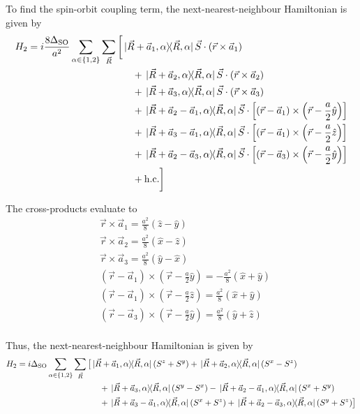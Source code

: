 \documentclass[12pt,a4paper,titlepage]{article}
\newcommand{\trm}[1]{\textrm{#1}} %
\begin{document}
To find the spin-orbit coupling term, the next-nearest-neighbour Hamiltonian is given by
\begin{equation}
\begin{aligned}
H_{2}=i\frac{8\Delta_{\trm{SO}}}{a^{2}}\sum_{\alpha\in\{1,2\}}\sum_{\vec{R}}\bigg[&\ketbra*{\vec{R}+\vec{a}_{1},\alpha}{\vec{R},\alpha}\vec{S}\cdot(\vec{r}\times\vec{a}_{1})\\
&\quad+\ketbra*{\vec{R}+\vec{a}_{2},\alpha}{\vec{R},\alpha}\vec{S}\cdot(\vec{r}\times\vec{a}_{2})\\
&\quad+\ketbra*{\vec{R}+\vec{a}_{3},\alpha}{\vec{R},\alpha}\vec{S}\cdot(\vec{r}\times\vec{a}_{3})\\
&\quad+\ketbra*{\vec{R}+\vec{a}_{2}-\vec{a}_{1},\alpha}{\vec{R},\alpha}\vec{S}\cdot\left[(\vec{r}-\vec{a}_{1})\times\left(\vec{r}-\frac{a}{2}\hat{y}\right)\right]\\
&\quad+\ketbra*{\vec{R}+\vec{a}_{3}-\vec{a}_{1},\alpha}{\vec{R},\alpha}\vec{S}\cdot\left[(\vec{r}-\vec{a}_{1})\times\left(\vec{r}-\frac{a}{2}\hat{z}\right)\right]\\
&\quad+\ketbra*{\vec{R}+\vec{a}_{2}-\vec{a}_{3},\alpha}{\vec{R},\alpha}\vec{S}\cdot\left[(\vec{r}-\vec{a}_{3})\times\left(\vec{r}-\frac{a}{2}\hat{y}\right)\right]\\
&\quad+\trm{h.c.}\bigg]
\end{aligned}
\end{equation}

The cross-products evaluate to
\[
\begin{aligned}
&\vec{r}\times\vec{a}_{1}=\frac{a^{2}}{8}(\hat{z}-\hat{y})\\
&\vec{r}\times\vec{a}_{2}=\frac{a^{2}}{8}(\hat{x}-\hat{z})\\
&\vec{r}\times\vec{a}_{3}=\frac{a^{2}}{8}(\hat{y}-\hat{x})\\
&(\vec{r}-\vec{a}_{1})\times\left(\vec{r}-\frac{a}{2}\hat{y}\right)=-\frac{a^{2}}{8}(\hat{x}+\hat{y})\\
&(\vec{r}-\vec{a}_{1})\times\left(\vec{r}-\frac{a}{2}\hat{z}\right)=\frac{a^{2}}{8}(\hat{x}+\hat{y})\\
&(\vec{r}-\vec{a}_{3})\times\left(\vec{r}-\frac{a}{2}\hat{y}\right)=\frac{a^{2}}{8}(\hat{y}+\hat{z})\\
\end{aligned}
\]

Thus, the next-nearest-neighbour Hamiltonian is given by
\begin{equation}
\begin{aligned}
H_{2}=i\Delta_{\trm{SO}}\sum_{\alpha\in\{1,2\}}\sum_{\vec{R}}\big[&\ketbra*{\vec{R}+\vec{a}_{1},\alpha}{\vec{R},\alpha}(S^{z}+S^{y})+\ketbra*{\vec{R}+\vec{a}_{2},\alpha}{\vec{R},\alpha}(S^{x}-S^{z})\\
&\quad+\ketbra*{\vec{R}+\vec{a}_{3},\alpha}{\vec{R},\alpha}(S^{y}-S^{x})-\ketbra*{\vec{R}+\vec{a}_{2}-\vec{a}_{1},\alpha}{\vec{R},\alpha}(S^{x}+S^{y})\\
&\quad+\ketbra*{\vec{R}+\vec{a}_{3}-\vec{a}_{1},\alpha}{\vec{R},\alpha}(S^{x}+S^{z})+\ketbra*{\vec{R}+\vec{a}_{2}-\vec{a}_{3},\alpha}{\vec{R},\alpha}(S^{y}+S^{z})\big]\\
\end{aligned}
\end{equation}
\end{document}
